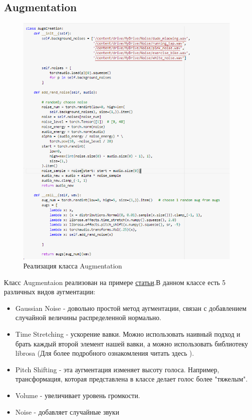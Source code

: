 \documentclass[a4paper,12pt]{article}
\begin{document}
 	\subsection{Augmentation}
		\begin{figure}[H]
			\centering
			\includegraphics[width=0.7\linewidth]{Image/Augmentation2}
			\caption{Реализация класса Augmentation}
			\label{fig:augmentation2}
		\end{figure}

 	 
 	 Класс Augmentaion реализован на примере \href{https://towardsdatascience.com/audio-deep-learning-made-simple-part-3-data-preparation-and-augmentation-24c6e1f6b52}{статьи}.В данном классе есть 5 различных видов аугментации: 
 	 
 	 \begin{itemize}
 	 	\item Gaussian Noise - довольно простой метод аугментации, связан с добавлением случайной величины распределенной нормально. 
 	 	\item Time Stretching - ускорение вавки. Можно использовать наивный подход и брать каждый второй элемент нашей вавки, а можно использовать библиотеку librosa (Для более подробного ознакомления читать здесь \cite{2}).
 	 	\item Pitch Shifting - эта аугментация изменяет высоту голоса. Например, трансформация, которая представлена в классе делает голос более "тяжелым".
 	 	\item Volume - увеличивает уровень громкости.
 	 	\item Noise - добавляет случайные звуки
 	 \end{itemize}
  	
\end{document}
